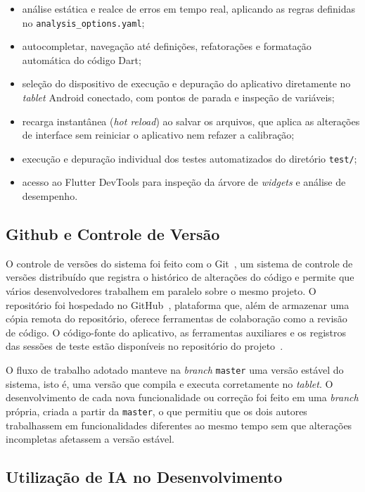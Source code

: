 \begin{itemize}
    \item análise estática e realce de erros em tempo real, aplicando as regras definidas no \texttt{analysis\_options.yaml};
    \item autocompletar, navegação até definições, refatorações e formatação automática do código Dart;
    \item seleção do dispositivo de execução e depuração do aplicativo diretamente no \textit{tablet} Android conectado, com pontos de parada e inspeção de variáveis;
    \item recarga instantânea (\textit{hot reload}) ao salvar os arquivos, que aplica as alterações de interface sem reiniciar o aplicativo nem refazer a calibração;
    \item execução e depuração individual dos testes automatizados do diretório \texttt{test/};
    \item acesso ao Flutter DevTools para inspeção da árvore de \textit{widgets} e análise de desempenho.
\end{itemize}
    \subsection{Github e Controle de Versão}

O controle de versões do sistema foi feito com o Git~\cite{git_docs}, um sistema de controle de versões distribuído que registra o histórico de alterações do código e permite que vários desenvolvedores trabalhem em paralelo sobre o mesmo projeto. O repositório foi hospedado no GitHub~\cite{github_docs}, plataforma que, além de armazenar uma cópia remota do repositório, oferece ferramentas de colaboração como a revisão de código. O código-fonte do aplicativo, as ferramentas auxiliares e os registros das sessões de teste estão disponíveis no repositório do projeto~\cite{repo_app}.

O fluxo de trabalho adotado manteve na \textit{branch} \texttt{master} uma versão estável do sistema, isto é, uma versão que compila e executa corretamente no \textit{tablet}. O desenvolvimento de cada nova funcionalidade ou correção foi feito em uma \textit{branch} própria, criada a partir da \texttt{master}, o que permitiu que os dois autores trabalhassem em funcionalidades diferentes ao mesmo tempo sem que alterações incompletas afetassem a versão estável.
    \subsection{Utilização de IA no Desenvolvimento} \label{sec:uso_ia}

